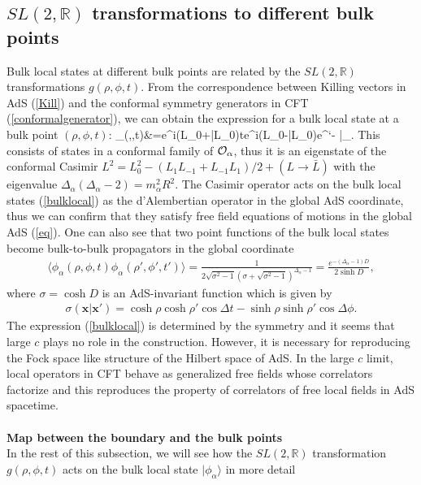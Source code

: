 \documentclass[11pt,a4paper]{article}
\def\a{{\alpha}}
\def\s{\sqrt}
\def\CO{{\cal O}}
\def\ba{\begin{eqnarray}}
\def\ea{\end{eqnarray}}
\def\bal#1\eal{\begin{align}#1\end{align}}
\def\r{\rightarrow}
\def\f {\frac}
\def\ddd{\cdot\cdot\cdot}
\def\no{\nonumber \\}
\def\la{\langle}
\def\lb{\rangle}
\def\r{\rightarrow}
\def\q{\quad}
\begin{document}
\subsection{$SL(2,\mathbb{R})$ transformations to different bulk points}
Bulk local states at different bulk points are related by the $SL(2,\mathbb{R})$ transformations $g(\rho,\phi,t)$. From the correspondence between Killing vectors in AdS (\ref{Kill}) and the conformal symmetry generators in CFT (\ref{conformalgenerator}), we can obtain the expression for a bulk local state at a bulk point $(\rho,\phi,t)$:
\bal
|\phi_\a(\rho,\phi,t)\lb&=e^{i(L_0+\bar{L}_0)t}e^{i(L_0-\bar{L}_0)\phi}e^{\mathchar`-
\rho{}}|\phi_\a\lb. %
\label{bulklocal}
\eal
This consists of states in a conformal family of $\CO_\a$, thus it is an eigenstate of the conformal Casimir $L^2=L^2_0-(L_1L_{-1}+L_{-1}L_{1})/2+(L\r \bar{L})$
with the eigenvalue $\Delta_\a(\Delta_\a-2)=m^2_\a R^2$. The Casimir operator acts on the bulk local states (\ref{bulklocal}) as the d'Alembertian operator in the global AdS coordinate, thus we can confirm that they satisfy free field equations of motions in the global AdS (\ref{eq}).
One can also see that two point functions of the bulk local states become bulk-to-bulk propagators in the global coordinate \cite{cMERA}
\ba
\la \phi_\a(\rho,\phi,t) \phi_\a(\rho',\phi',t')\lb=\f{1}{2\s{\sigma^2-1}(\sigma+\s{\sigma^2-1})^{\Delta_\a-1}}=\f{e^{-(\Delta_\a-1)D}}{2\sinh D},
\ea
where $\sigma=\cosh D$ is an AdS-invariant function which is given by
\ba
\sigma(\boldsymbol{x}|\boldsymbol{x}')=\cosh\rho\cosh\rho'\cos\Delta t-\sinh\rho\sinh\rho'\cos\Delta\phi.
\ea
The expression (\ref{bulklocal}) is determined by the symmetry and it seems that large $c$ plays no role in the construction. However, it is necessary for reproducing the Fock space like structure of the Hilbert space of AdS. In the large $c$ limit, local operators in CFT  behave as generalized free fields whose correlators factorize and this reproduces the property of correlators of free local fields in AdS spacetime.
\\
\\
\textbf{Map between the boundary and the bulk points}\\
In the rest of this subsection, we will see how the $SL(2,\mathbb{R})$ transformation $g(\rho,\phi,t)$ acts on the bulk local state $|\phi_\a\lb$ in more detail
\end{document}
